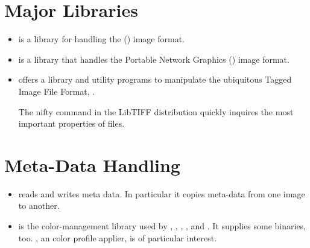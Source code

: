 \section[Libraries]{\label{sec:helpful-libraries}%
  Major Libraries}

\begin{itemize}
  \label{lib:jpeg}
\item
   is a library for handling the
  () image format.

  \label{lib:png}
\item
   is a library that handles the Portable Network
  Graphics () image format.

  \label{lib:tiff}
\item
   offers a library and utility programs
  to manipulate the ubiquitous Tagged Image File Format, .

  The nifty  command in the LibTIFF
  distribution quickly inquires the most important properties of  files.
\end{itemize}


\section[Meta-Data Handling]{\label{sec:meta-data-handling}%
  Meta-Data Handling}

\begin{itemize}
  \label{app:exiftool}
\item
   reads and writes
   meta data.  In particular it copies meta-data from
  one image to another.

  \label{app:littlecms}
\item
   is the color-management library used by
  , , , \App{}, and \OtherApp.  It
  supplies some binaries, too.  , an
   color profile applier, is of particular interest.
\end{itemize}



